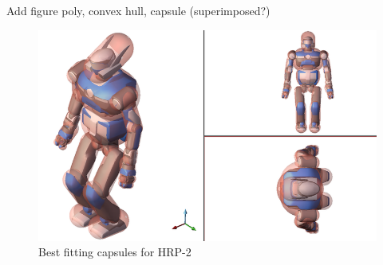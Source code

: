 
Add figure poly, convex hull, capsule (superimposed?)

\begin{figure}
  \centering
  \includegraphics[width=0.9\linewidth]
                  {src/chap3-optimal-motion-planning/figure/hrp2-capsule-transparent.png}
  \caption{Best fitting capsules for HRP-2}
  \label{hrp2-capsule}
\end{figure}

